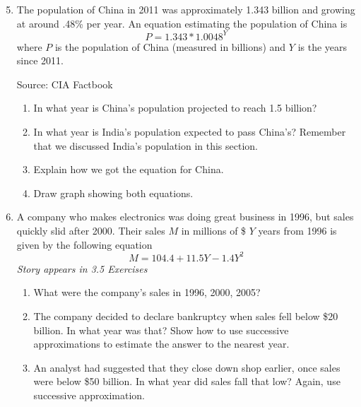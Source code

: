 \begin{enumerate} 
\setcounter{enumi}{4}

\item  The population of China in 2011 was approximately 1.343 billion and growing at around .48\% per year.  An equation estimating the population of China is
$$P = 1.343 \ast 1.0048^Y$$ where $P$ is the population of China (measured in billions) and $Y$ is the years since 2011. \hfill \begin{footnotesize} Source:  CIA Factbook \end{footnotesize}
\begin{enumerate}
\item In what year is China's population projected to reach 1.5 billion?
\item In what year is India's population expected to pass China's?  Remember that we discussed India's population in this section.
 \item Explain how we got the equation for China.
 \item Draw graph showing both equations.
\end{enumerate} 

\item A company who makes electronics was doing great business in 1996, but sales quickly slid after 2000.  Their sales $M$ in millions of \$ $Y$ years from 1996 is given by the following equation $$M = 104.4+11.5Y-1.4Y^2$$
\hfill \emph{Story appears in 3.5 Exercises}
\begin{enumerate}
\item What were the company's sales in 1996, 2000, 2005?
\item The company decided to declare bankruptcy when sales fell below \$20 billion.  In what year was that?  Show how to use successive approximations to estimate the answer to the nearest year. 
\item An analyst had suggested that they close down shop earlier, once sales were below \$50 billion.  In what year did sales fall that low? Again, use successive approximation.
\end{enumerate} 


\end{enumerate}
